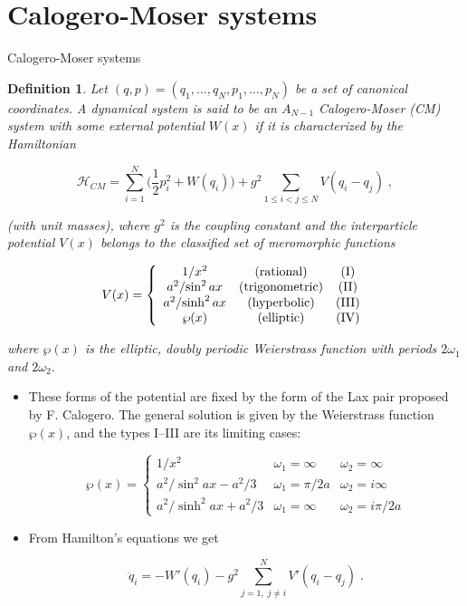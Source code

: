 \documentclass[aspectratio=169, 9pt]{beamer}
\newtheorem{defi}{Definition}
\begin{document}
\section{Calogero-Moser systems}
\begin{frame}[allowframebreaks]{Calogero-Moser systems}
\begin{defi}
Let $(q, p) = (q_1, \dots, q_N, p_1, \dots, p_N)$ be a set of canonical coordinates. A dynamical system is said to be an $A_{N-1}$ Calogero-Moser \textnormal{(CM)} system with some external potential $W(x)$ if it is characterized by the Hamiltonian

\begin{equation}
\mathcal{H}_{CM} = \sum_{i=1}^N \Big(\frac{1}{2} p_i^2 + W(q_i)\Big) + g^2 \sum_{1 \leq i < j \leq N} V(q_i - q_j)\;,
\end{equation}

(with unit masses), where $g^2$ is the coupling constant and the interparticle potential $V (x)$ belongs to the classified set of meromorphic functions

\[V(x) = \left \{ \begin{array}{ccc}
{1}/{x^2} & \textnormal{(rational)} & \textnormal{(I)}\\
{a^2}/{\sin^2{ax}} & \textnormal{(trigonometric)} & \textnormal{(II)}\\
{a^2}/{\sinh^2{ax}} & \textnormal{(hyperbolic)} & \textnormal{(III)}\\
\wp (x) & \textnormal{(elliptic)} & \textnormal{(IV)}
\end{array}
\right.\]

where $\wp (x)$ is the \textit{elliptic, doubly periodic Weierstrass function} with periods $2\omega_1$ and $2\omega_2$.
\end{defi}

\begin{itemize}
\item These forms of the potential are fixed by the form of the Lax pair proposed by F. Calogero. The general solution is given by the Weierstrass function $\wp(x)$, and the types I--III are its limiting cases:

\begin{equation}
    \wp(x) = \left \{ \begin{array}{ccc}
    {1}/{x^2} & \omega_1 = \infty & \omega_2 = \infty\\
    {a^2}/{\sin^2{ax}} - {a^2}/{3} & \omega_1 = {\pi} / {2a} & \omega_2 = i\infty\\
    {a^2}/{\sinh^2{ax}} + {a^2}/{3} & \omega_1 = \infty\ & \omega_2 = {i\pi}/{2a}
\end{array}
\right.
\end{equation}

\item From Hamilton's equations we get

\begin{equation}
    \ddot q_i = - W'(q_i) - g^2 \sum_{j = 1,\;j \neq i}^N V'(q_i - q_j)\;.
\end{equation}
\end{itemize}
\end{frame}
\end{document}
